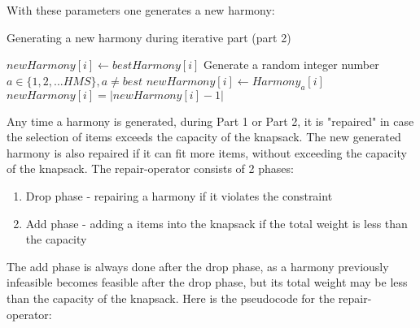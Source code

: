 \documentclass[titlepage]{article}
\begin{document}
With these parameters one generates a new harmony:

\begin{breakablealgorithm}
\caption{Generating a new harmony during iterative part (part 2)}\label{harmonyGen}
    \begin{algorithmic}[1]
                \State $newHarmony[i] \gets bestHarmony[i]$ 
            \Else
                \State Generate a random integer number $a \in \{1, 2, ... HMS\}, a \neq best$
                \State $newHarmony[i] \gets Harmony_{a}[i]$ 
                    \State $newHarmony[i] = |newHarmony[i]-1|$ \Comment{\textcolor{blue}{Flipping i'th item - mutation}}
                \EndIf
            \EndIf
        \EndFor
    \end{algorithmic}
\end{breakablealgorithm}
\vskip 0.5cm


Any time a harmony is generated, during Part 1 or Part 2, it is "repaired" in case the selection of items exceeds the capacity of the knapsack. The new generated harmony is also repaired if it can fit more items, without exceeding the capacity of the knapsack. The repair-operator consists of 2 phases:
\begin{enumerate}
    \item Drop phase - repairing a harmony if it violates the constraint
    \item Add phase - adding a items into the knapsack if the total weight is less than the capacity
\end{enumerate}

The add phase is always done after the drop phase, as a harmony previously infeasible becomes feasible after the drop phase, but its total weight may be less than the capacity of the knapsack. Here is the pseudocode for the repair-operator:
\end{document}
